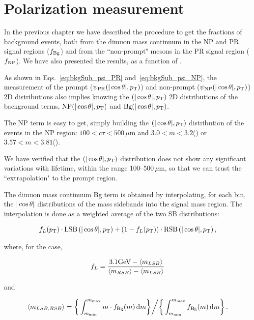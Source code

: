 \section{Polarization measurement}
\label{sec:polarizations}

In the previous chapter we have described the procedure to get the fractions of background events, 
both from the dimuon mass continuum in the NP and PR signal regions ($f_{\rm Bg}$)
and from the ``non-prompt" mesons in the PR signal region ($f_{\rm NP}$).
We have also presented the results, as a function of \pt.

As shown in Eqs.~\ref{eq:bkgSub_psi_PR} and~\ref{eq:bkgSub_psi_NP}, 
the measurement of the prompt ($\psi_\mathrm{PR}(|\cos\theta|,p_\text{T})$) and
non-prompt ($\psi_{\rm NP}(|\cos\theta|,p_\text{T})$) 2D distributions also implies knowing 
the $(|\cos\theta|,p_\text{T})$ 2D distributions of the background terms,
$\text{NP}(|\cos\theta|,p_\text{T})$ and $\text{Bg}(|\cos\theta|,p_\text{T})$.

The NP term is easy to get, simply building the $(|\cos\theta|,p_\text{T})$ distribution of the
events in the NP region:
$100 < c\tau < 500\,\mu$m 
and $3.0 < m < 3.2$\GeV (\jpsi) or $3.57 < m < 3.81$\GeV (\psip).

We have verified that the $(|\cos\theta|,p_\text{T})$ distribution does not show any 
significant variations with lifetime, within the range 100--500\,$\mu$m,
so that we can trust the ``extrapolation" to the prompt region.

The dimuon mass continuum Bg term is obtained by interpolating, for each \pt bin, 
the $|\cos\theta|$ distributions of the mass sidebands into the signal mass region.
The interpolation is done as a weighted average of the two SB distributions:

\begin{equation}
f_{L}(p_\text{T}) \cdot \text{LSB}\,(|\cos\theta|,p_\text{T})+(1-f_{L}(p_\text{T}) ) \cdot \text{RSB}\,(|\cos\theta|,p_\text{T}) \, ,
\end{equation}

where, for the \jpsi case,

\begin{equation}
f_L = \frac{3.1\text{GeV} - \langle m_{LSB} \rangle} {\langle m_{RSB} \rangle - \langle m_{LSB} \rangle}
\end{equation}

and

\begin{equation}
\langle m_{LSB,RSB} \rangle = 
\bigg\{ \int_{m_{\rm min}}^{m_{\rm max}} m \cdot f_{\rm Bg}(m) \, {\rm d}m \bigg\} \bigg/
\bigg\{ \int_{m_{\rm min}}^{m_{\rm max}}  f_{\rm Bg}(m) \, {\rm d}m \bigg\} \, .
\end{equation}

